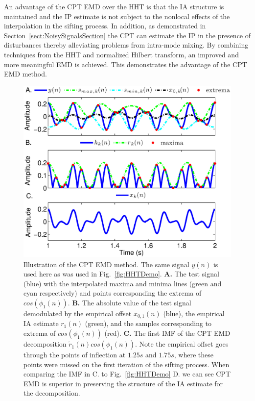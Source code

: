 \documentclass[a4paper]{IEEEtran}
\begin{document}
An advantage of the CPT EMD over the HHT is that the IA structure is maintained and the IP estimate is not subject to the nonlocal effects of the interpolation in the sifting process. In addition, as demonstrated in Section~\ref{sect:NoisySignalsSection} the CPT can estimate the IP in the presence of disturbances thereby alleviating problems from intra-mode mixing. By combining techniques from the HHT and normalized Hilbert transform, an improved and more meaningful EMD is achieved. This demonstrates the advantage of the CPT EMD method. %
% 
\begin{figure}
\centering
\includegraphics[scale=0.42]{./Figures/CPT_EMD_demo.eps}
\caption[CPT_EMD]{Illustration of the CPT EMD method. The same signal $y(n)$ is used here as was used in Fig.~\ref{fig:HHTDemo}. \textbf{A.} The test signal (blue) with the interpolated maxima and minima lines (green and cyan respectively) and points corresponding the extrema of $cos\left(\phi_1(n)\right)$. \textbf{B.} The absolute value of the test signal demodulated by the empirical offset $x_{0,1}(n)$ (blue), the empirical IA estimate $r_{1}(n)$ (green), and the samples corresponding to extrema of $cos\left(\phi_1\left(n\right)\right)$ (red). \textbf{C.} The first IMF of the CPT EMD decomposition $\tilde{r}_1(n)cos\left(\phi_1\left(n\right)\right)$. Note the empirical offset goes through the points of inflection at $1.25 s$ and $1.75s$, where these points were missed on the first iteration of the sifting process. When comparing the IMF in C. to Fig.~\ref{fig:HHTDemo} D. we can see CPT EMD is superior in preserving the structure of the IA estimate for the decomposition.}
\label{CPT_EMD}
\end{figure}
\end{document}
